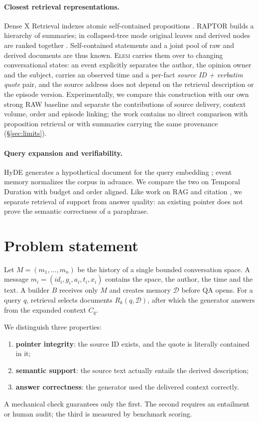 \documentclass[11pt,a4paper]{article}
\newcommand{\method}{\textsc{Elem}}
\begin{document}
\paragraph{Closest retrieval representations.}
Dense X Retrieval indexes atomic self-contained propositions
\citep{chen2023densex}. RAPTOR builds a hierarchy of summaries; in collapsed-tree
mode original leaves and derived nodes are ranked together \citep{sarthi2024raptor}.
Self-contained statements and a joint pool of raw and derived documents are thus
known. \method{} carries them over to changing conversational states: an event
explicitly separates the author, the opinion owner and the subject, carries an
observed time and a per-fact \emph{source ID + verbatim quote} pair, and the source
address does not depend on the retrieval description or the episode version.
Experimentally, we compare this construction with our own strong RAW baseline and
separate the contributions of source delivery, context volume, order and episode
linking; the work contains no direct comparison with proposition retrieval or with
summaries carrying the same provenance (§\ref{sec:limits}).

\paragraph{Query expansion and verifiability.}
HyDE generates a hypothetical document for the query embedding \citep{gao2023hyde};
event memory normalizes the corpus in advance. We compare the two on Temporal
Duration with budget and order aligned. Like work on RAG and citation
\citep{lewis2020,gao2023}, we separate retrieval of support from answer quality: an
existing pointer does not prove the semantic correctness of a paraphrase.

\section{Problem statement}
\label{sec:problem}

Let $M=(m_1,\ldots,m_n)$ be the history of a single bounded conversation space. A
message $m_i=(id_i,g_i,a_i,t_i,x_i)$ contains the space, the author, the time and
the text. A builder $B$ receives only $M$ and creates memory $\mathcal{D}$ before QA
opens. For a query $q$, retrieval selects documents $R_k(q,\mathcal{D})$, after
which the generator answers from the expanded context $C_q$.

We distinguish three properties:
\begin{enumerate}
\item \textbf{pointer integrity}: the source ID exists, and the quote is literally
contained in it;
\item \textbf{semantic support}: the source text actually entails the derived
description;
\item \textbf{answer correctness}: the generator used the delivered context
correctly.
\end{enumerate}
A mechanical check guarantees only the first. The second requires an entailment
or human audit; the third is measured by benchmark scoring.
\end{document}
